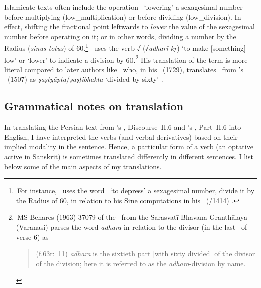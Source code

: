 \begin{enumerate}[topsep=0pt]
    Islamicate texts often include the operation  \munhatt\ `lowering' a sexagesimal number before multiplying (\gls{low_multiplication}) or before dividing (\gls{low_division}). In effect, shifting the fractional point leftwards to \textit{lower} the value of the sexagesimal number before operating on it; or in other words, dividing a number by the Radius (\textit{sinus totus}) of 60.\footnote{\,For instance, \alKashi\ uses the word \munhatt\ `to depress' a sexagesimal number, \ie divide it by the Radius of 60, in relation to his Sine computations in his \KhaqaniZij\ (/1414) \parencite[40]{Hamadani_Zadeh_Khaqani}.} \Nityananda\ uses the verb √ (√\textit{adharī-kṛ}) `to make [something] low' or `lower' to indicate a division by 60.\footnote{\,MS Benares (1963) 37079 of the \Sarvasiddhantaraja\ from the Sarasvatī Bhavana Granthālaya (Varanasi) parses the word  \textit{adhara} in relation to the divisor (in the last \pada\ of verse 6) as \begin{quote} (f.\thinspace 63r:~11)\newline
    \textit{adhara} is the sixtieth part [\lit with sixty divided] of the divisor of the division; here it is referred to as the \textit{adhara}-division by name.
    \end{quote}}
    His translation of the term is more literal compared to later authors like \Nayanasukhopadhyaya\ who, in his \Sarahatajakiravirajandi\ (1729), translates \munhatt\ from \alBirjandi's \SharhalTadhkirah\ (1507) as \textit{ṣaṣtyāpta}/\textit{ṣaṣṭibhakta} `divided by sixty'  \parencite[265]{KusubaPingree}.
\end{enumerate}

\subsection{Grammatical notes on translation} \label{grammatical_notes_translation}
In translating the Persian text from \MullaFarid's \ZijiShahJahani, Discourse~II.6 and \Nityananda's \Siddhantasindhu, Part~II.6 into English, I have interpreted the verbs (and verbal derivatives) based on their implied modality in the sentence. Hence, a particular form of a verb (\eg an optative active in Sanskrit) is sometimes translated differently in different sentences. I list below some of the main aspects of my translations. 

